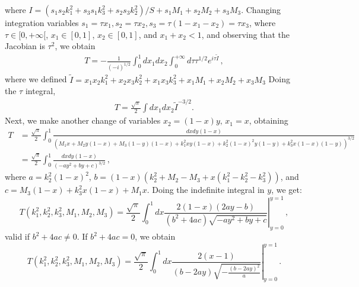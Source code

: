 \documentclass[twoside]{article}
\begin{document}
where $I = (s_1s_2k^2_1 + s_3s_1k^2_3 + s_2s_3k^2_2)/S + s_1M_1 + s_2M_2 + s_3M_3$. Changing integration variables $s_1 = \tau x_1, s_2 =
\tau x_2, s_3 = \tau(1 - x_1 - x_2) = \tau x_3$, where $\tau \in [0,+\infty[$, $x_1 \in [0,1]$, $x_2 \in [0,1]$, and $x_1 + x_2 < 1$, and observing that the Jacobian is $\tau^2$, we obtain
\begin{align}
  T = -\frac{1}{(-i)^{1/2}}\int_0^1 dx_1 dx_2 \int_0^{+\infty}d\tau \tau^{1/2}e^{i\tau \tilde{I}}\,,
\end{align}
where we defined $\tilde{I} = x_1 x_2 k^2_1 + x_2 x_3 k^2_2 + x_1 x_3 k^2_3 + x_1 M_1 + x_2 M_2 + x_3 M_3$ 
Doing the $\tau$ integral,
\begin{align}
  T = \frac{\sqrt{\pi}}{2}\int dx_1 dx_2\tilde{I}^{-3/2}.
\end{align}
Next, we make another change of variables $x_2  = (1 - x)y,\, x_1 = x$, obtaining
\begin{align}
T&=\frac{\sqrt{\pi}}{2}\int_0^1 \frac{dx dy (1-x)}{\left( M_1 x +  M_2 y (1-x) + M_3 (1-y) (1-x) + k^2_1 x y (1-x) + k^2_2 (1-x)^2 y (1-y) + k^2_3 x (1-x)(1-y) \right)^{3/2}}\\
& = \frac{\sqrt{\pi}}{2}\int_0^1 \frac{dx dy (1-x)}{\left(-ay^2 + by + c \right)^{3/2}}\,, \label{eq:Tsame}
\end{align}
where $a = k_2^2 (1-x)^2$, $b = (1-x)(k_2^2 + M_2 - M_3+x(k_1^2-k_2^2-k_3^2))$, and $c = M_3(1-x) + k_3^2 x (1-x) + M_1 x$.
Doing the indefinite integral in $y$, we get:
\begin{equation}
T(k^2_1, k^2_2, k^2_3, M_1, M_2, M_3) =\frac{\sqrt{\pi}}{2}\int_0^1 dx \left.\frac{2(1-x) (2 a y - b)}{\left(b^2 + 4 a c\right) \sqrt{-ay^2 + by + c}}\right|^{y = 1}_{y = 0}\,,
\end{equation}
valid if $b^2 + 4 a c \neq 0$. If $b^2 + 4 a c = 0$, we obtain
\begin{equation}
T(k^2_1, k^2_2, k^2_3, M_1, M_2, M_3) =\frac{\sqrt{\pi}}{2}\int_0^1 dx \left.\frac{2 (x-1)}{(b-2 a y) \sqrt{-\frac{(b-2 a y)^2}{a}}}\right|^{y = 1}_{y = 0}\,.
\end{equation}
\end{document}
